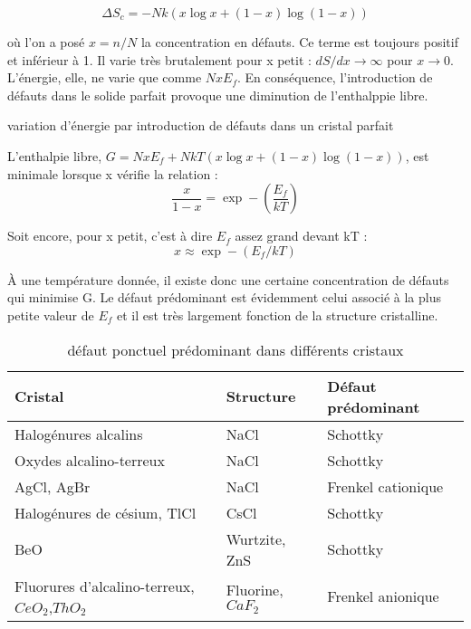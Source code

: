 \begin{equation}
    \Delta S_c = - N k (x \log x + (1-x) \log (1-x))
\end{equation}

où l'on a posé $x = n/N$ la concentration en défauts. Ce terme est toujours
positif et inférieur à 1. Il varie très brutalement pour x petit : $dS/dx
\rightarrow \infty$ pour $x\rightarrow 0$. L'énergie, elle, ne varie que comme
$NxE_f$. En conséquence, l'introduction de défauts dans le solide parfait
provoque une diminution de l'enthalppie libre.

\begin{marginfigure}
    \TODO
    \caption{variation d'énergie par introduction de défauts dans un cristal
    parfait}
    \label{varenergcristparf}
\end{marginfigure}

L'enthalpie libre, $G = NxE_f + NkT (x \log x + (1-x)\log(1-x))$, est minimale
lorsque x vérifie la relation :
\begin{equation}
    \frac{x}{1-x} = \exp - \left( \frac{E_f}{kT} \right)
\end{equation}

Soit encore, pour x petit, c'est à dire $E_f$ assez grand devant kT :
\begin{equation}
    x \approx \exp - (E_f / kT)
\end{equation}

À une température donnée, il existe donc une certaine concentration de défauts
qui minimise G. Le défaut prédominant est évidemment celui associé à la plus
petite valeur de $E_f$ et il est très largement fonction de la structure
cristalline.

\begin{table*}[ht]
    \begin{tabularx}{\textwidth}{lXX}
        \toprule
        Cristal & Structure & Défaut prédominant \\
        \midrule
        Halogénures alcalins & NaCl & Schottky \\
        Oxydes alcalino-terreux & NaCl & Schottky \\
        AgCl, AgBr & NaCl & Frenkel cationique \\
        Halogénures de césium, TlCl & CsCl & Schottky \\
        BeO & Wurtzite, ZnS & Schottky \\
        Fluorures d'alcalino-terreux, $CeO_2$,$ThO_2$ & Fluorine, $CaF_2$ &
        Frenkel anionique\\
        \bottomrule
    \end{tabularx}
    \label{}
    \caption{défaut ponctuel prédominant dans différents cristaux}
\end{table*}

